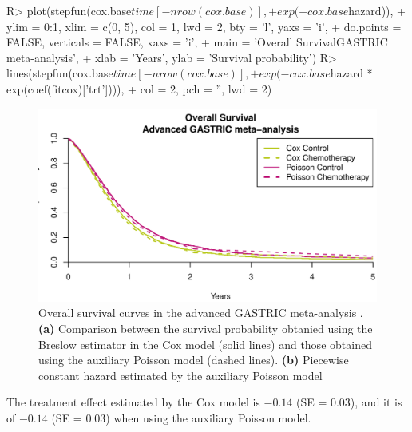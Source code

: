 \documentclass[article,shortnames, nojss]{jss}\usepackage[]{graphicx}\usepackage[]{color}
\begin{document}
\begin{Schunk}
\begin{Sinput}
R>   plot(stepfun(cox.base$time[-nrow(cox.base)], 
+                exp(-cox.base$hazard)),
+        ylim = 0:1, xlim = c(0, 5), col = 1, lwd = 2, bty = 'l', yaxs = 'i',
+        do.points = FALSE, verticals = FALSE, xaxs = 'i',
+        main = 'Overall Survival\nAdvanced GASTRIC meta-analysis',
+        xlab = 'Years', ylab = 'Survival probability')
R>   lines(stepfun(cox.base$time[-nrow(cox.base)],
+                exp(-cox.base$hazard * exp(coef(fitcox)['trt']))),
+        col = 2, pch = '', lwd = 2)
\end{Sinput}
\begin{figure}
\includegraphics[width=\textwidth]{figure/poissonize-1} \caption{Overall survival curves in the advanced GASTRIC meta-analysis \citep{GASTRIC13}. \textbf{(a)} Comparison between the survival probability obtanied using the Breslow estimator in the Cox model (solid lines) and those obtained using the auxiliary Poisson model (dashed lines). \textbf{(b)} Piecewise constant hazard estimated by the auxiliary Poisson model}\label{fig:poissonize}
\end{figure}
\end{Schunk}
The treatment effect estimated by the Cox model is
  \ensuremath{-0.14} (SE = 0.03), 
  and it is of 
  \ensuremath{-0.14} 
  (SE = 0.03)
  when using the auxiliary Poisson model.
\end{document}
